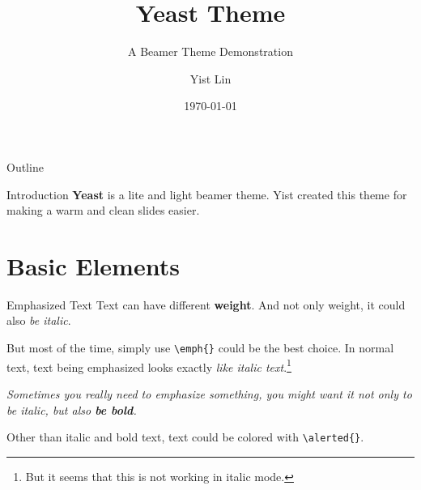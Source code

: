 \documentclass[10pt]{beamer}
\title{Yeast Theme}
\subtitle{A Beamer Theme Demonstration}
\author[Yist]{Yist Lin}
\date{\today}
\begin{document}
\maketitle

\begin{frame}{Outline}
  \tableofcontents
\end{frame}

\begin{frame}{Introduction}
    \textbf{Yeast} is a lite and light beamer theme.
    Yist created this theme for making a warm and clean slides easier.
\end{frame}

\section{Basic Elements}

\begin{frame}{Emphasized Text}
  Text can have different \textbf{weight}.
  And not only weight, it could also \textit{be italic}.

  But most of the time, simply use \texttt{\textbackslash{}emph\{\}} could be the best choice.
  In normal text, text being emphasized looks exactly \emph{like italic text}.\footnote{But it seems that this is not working in italic mode.}

  \textit{Sometimes you really need to emphasize something, you might want it not only to be italic, but also \textbf{be bold}.}

  Other than italic and bold text, text could \alert{be colored} with \texttt{\textbackslash{}alerted\{\}}.
\end{frame}
\end{document}
